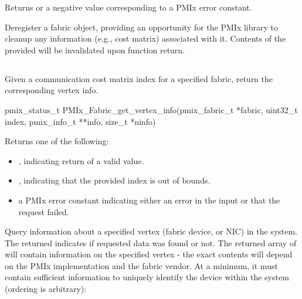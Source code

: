 Returns  or a negative value corresponding to a \ac{PMIx} error constant.

\descr

Deregister a fabric object, providing an opportunity for the \ac{PMIx} library to cleanup any information (e.g., cost matrix) associated with it. Contents of the provided  will be invalidated upon function return.


\subsection{}

\summary

Given a communication cost matrix index for a specified fabric, return the corresponding vertex info.

\format

\cspecificstart
\begin{codepar}
pmix_status_t
PMIx_Fabric_get_vertex_info(pmix_fabric_t *fabric, uint32_t index,
                            pmix_info_t **info, size_t *ninfo)
\end{codepar}
\cspecificend

\begin{arglist}
\end{arglist}

Returns one of the following:

\begin{itemize}
    \item {}, indicating return of a valid value.
    \item {}, indicating that the provided index is out of bounds.
    \item a \ac{PMIx} error constant indicating either an error in the input or that the request failed.
\end{itemize}

\descr

Query information about a specified vertex (fabric device, or \ac{NIC}) in the system. The returned  indicates if requested data was found or not. The returned array of  will contain information on the specified vertex - the exact contents will depend on the \ac{PMIx} implementation and the fabric vendor. At a minimum, it must contain sufficient information to uniquely identify the device within the system (ordering is arbitrary):

